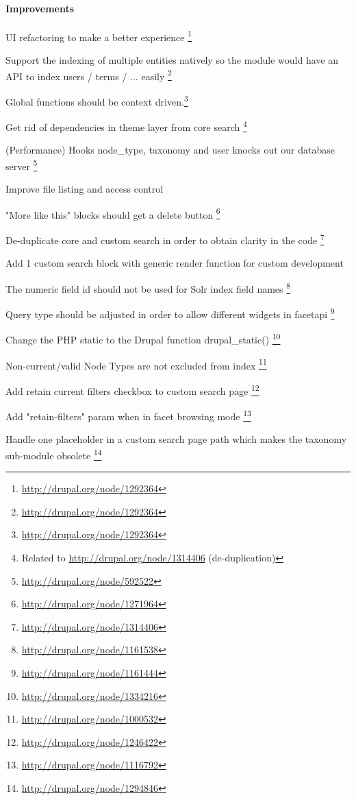 \paragraph{Improvements}
\begin{packed_itemize}
\item UI refactoring to make a better experience \footnote{\url{http://drupal.org/node/1292364}}
\item Support the indexing of multiple entities natively so the module would have an API to index users / terms / ... easily \footnote{\url{http://drupal.org/node/1292364}}
\item Global functions should be context driven.\footnote{\url{http://drupal.org/node/1292364}}
\item Get rid of dependencies in theme layer from core search \footnote{Related to \url{http://drupal.org/node/1314406} (de-duplication)}
\item (Performance) Hooks node\_type, taxonomy and user knocks out our database server \footnote{\url{http://drupal.org/node/592522}}
\item Improve file listing and access control
\item "More like this" blocks should get a delete button \footnote{\url{http://drupal.org/node/1271964}}
\item De-duplicate core and custom search in order to obtain clarity in the code \footnote{\url{http://drupal.org/node/1314406}}
\item Add 1 custom search block with generic render function for custom development
\item The numeric field id should not be used for Solr index field names \footnote{\url{http://drupal.org/node/1161538}}
\item Query type should be adjusted in order to allow different widgets in facetapi \footnote{\url{http://drupal.org/node/1161444}}
\item Change the PHP static to the Drupal function drupal\_static() \footnote{\url{http://drupal.org/node/1334216}}
\item Non-current/valid Node Types are not excluded from index \footnote{\url{http://drupal.org/node/1000532}}
\item Add retain current filters checkbox to custom search page \footnote{\url{http://drupal.org/node/1246422}}
\item Add "retain-filters" param when in facet browsing mode \footnote{\url{http://drupal.org/node/1116792}}
\item Handle one placeholder in a custom search page path which makes the taxonomy sub-module obsolete \footnote{\url{http://drupal.org/node/1294846}}

\end{packed_itemize}
